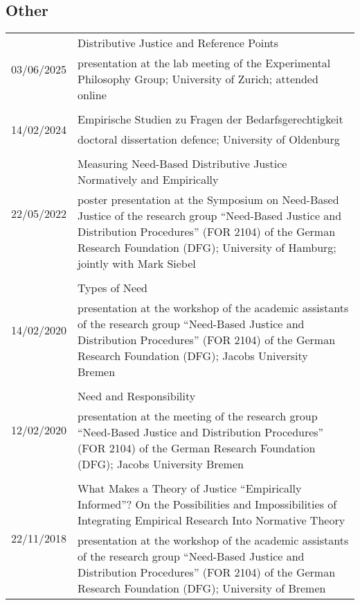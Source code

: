\documentclass[a4paper,10pt]{article}
\begin{document}
\subsection*{Other}
\begin{longtable}{p{2.5cm}p{11cm}}
\multirow{2}{2.5cm}{\footnotesize{03/06/2025}} & Distributive Justice and Reference Points\\
& \footnotesize{presentation at the lab meeting of the Experimental Philosophy Group; University of Zurich; attended online}\\
\\
\multirow{2}{2.5cm}{\footnotesize{14/02/2024}} & Empirische Studien zu Fragen der Bedarfsgerechtigkeit\\
& \footnotesize{doctoral dissertation defence; University of Oldenburg}\\
\\
\multirow{2}{2.5cm}{\footnotesize{22/05/2022}} & Measuring Need-Based Distributive Justice Normatively and Empirically\\
& \footnotesize{poster presentation at the Symposium on Need-Based Justice of the research group \enquote{Need-Based Justice and Distribution Procedures} (FOR 2104) of the German Research Foundation (DFG); University of Hamburg; jointly with Mark Siebel}\\
\\
\multirow{2}{2.5cm}{\footnotesize{14/02/2020}} & Types of Need\\
& \footnotesize{presentation at the workshop of the academic assistants of the research group \enquote{Need-Based Justice and Distribution Procedures} (FOR 2104) of the German Research Foundation (DFG); Jacobs University Bremen}\\
\\
\multirow{2}{2.5cm}{\footnotesize{12/02/2020}} & Need and Responsibility\\
& \footnotesize{presentation at the meeting of the research group \enquote{Need-Based Justice and Distribution Procedures} (FOR 2104) of the German Research Foundation (DFG); Jacobs University Bremen}\\
\\
\multirow{2}{2.5cm}{\footnotesize{22/11/2018}} & What Makes a Theory of Justice \enquote{Empirically Informed}? On the Possibilities and Impossibilities of Integrating Empirical Research Into Normative Theory\\
& \footnotesize{presentation at the workshop of the academic assistants of the research group \enquote{Need-Based Justice and Distribution Procedures} (FOR 2104) of the German Research Foundation (DFG); University of Bremen}\\

\end{longtable}
\end{document}
